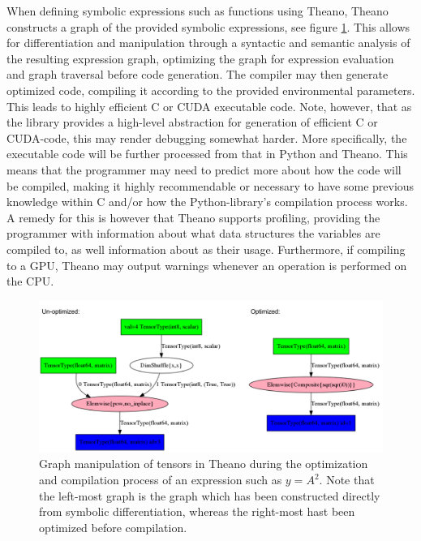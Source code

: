 When defining symbolic expressions such as functions using Theano, Theano constructs a graph of the provided symbolic expressions, see figure \ref{fig:theano_graph_demo}. This allows for differentiation and manipulation through a syntactic and semantic analysis of the resulting expression graph, optimizing the graph for expression evaluation and graph traversal before code generation. The compiler may then generate optimized code, compiling it according to the provided environmental parameters. This leads to highly efficient C or CUDA executable code.
Note, however, that as the library provides a high-level abstraction for generation of efficient C or CUDA-code, this may render debugging somewhat harder. More specifically, the executable code will be further processed from that in Python and Theano. This means that the programmer may need to predict more about how the code will be compiled, making it highly recommendable or necessary to have some previous knowledge within C and/or how the Python-library's compilation process works. A remedy for this is however that Theano supports profiling, providing the programmer with information about what data structures the variables are compiled to, as well information about as their usage. Furthermore, if compiling to a GPU, Theano may output warnings whenever an operation is performed on the CPU.

\begin{figure}
\centering
\includegraphics[width=12cm]{fig/unopt_opt_theano_graph}
\caption{Graph manipulation of tensors in Theano during the optimization and compilation process of an expression such as $y = A^2$. Note that the left-most graph is the graph which has been constructed directly from symbolic differentiation, whereas the right-most hast been optimized before compilation.}
\label{fig:theano_graph_demo}
\end{figure}

